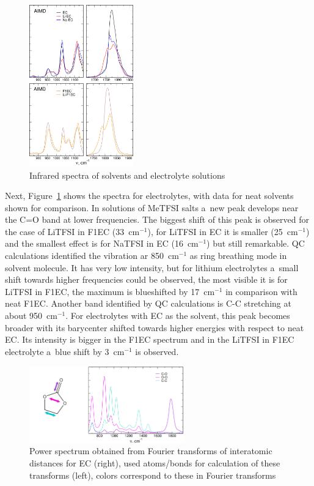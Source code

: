 \begin{figure}[ht]
    \centering
    \includegraphics[width=0.4\textwidth]{img/4-ir-spectra-from-aimd-simulations/3-carbonates/ir-electrolytes.png}
    \caption{Infrared spectra of solvents and electrolyte solutions}
    \label{fig:carbonates-ir-electrolytes}
\end{figure}

Next, Figure~\ref{fig:carbonates-ir-electrolytes} shows the spectra for electrolytes, with data for neat solvents shown for comparison. In solutions of MeTFSI salts a~new peak develops near the C=O band at lower frequencies. The biggest shift of this peak is observed for the case of LiTFSI in F1EC (33~cm$^{-1}$), for LiTFSI in EC it is smaller (25~cm$^{-1}$) and the smallest effect is for NaTFSI in EC (16~cm$^{-1}$) but still remarkable. QC calculations identified the vibration ar 850~cm$^{-1}$ as ring breathing mode in solvent molecule. It has very low intensity, but for lithium electrolytes a~small shift towards higher frequencies could be observed, the most visible it is for LiTFSI in F1EC, the maximum is blueshifted by 17~cm$^{-1}$ in comparison with neat F1EC. Another band identified by QC calculations is C-C stretching at about 950~cm$^{-1}$. For electrolytes with EC as the solvent, this peak becomes broader with its barycenter shifted towards higher energies with respect to neat EC. Its intensity is bigger in the F1EC spectrum and in the LiTFSI in F1EC electrolyte a~blue shift by 3~cm$^{-1}$ is observed.

\begin{figure}[ht]
    \centering
    \includegraphics[width=0.6\textwidth]{img/4-ir-spectra-from-aimd-simulations/3-carbonates/ft-carbonates-arrows.png}    
    \singlespacing
    \caption{Power spectrum obtained from Fourier transforms of interatomic distances for EC (right), used atoms/bonds for calculation of these transforms (left), colors correspond to these in Fourier transforms}
    \label{fig:carbonates-ft-carbonates}
\end{figure}

